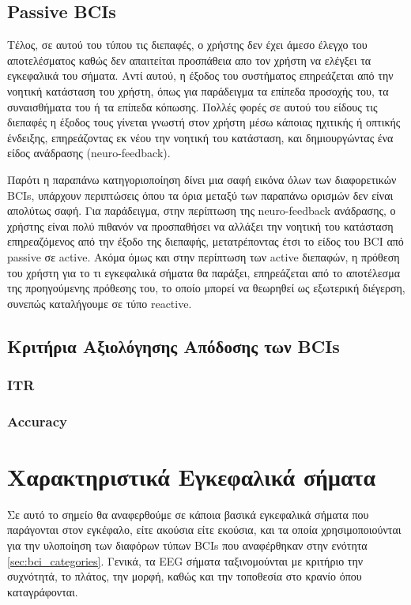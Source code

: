\documentclass[11pt,a4paper,english,greek,twoside]{../Thesis}
\begin{document}
  \subsection{Passive BCIs}
  \par Τέλος, σε αυτού του τύπου τις διεπαφές, ο χρήστης δεν έχει άμεσο έλεγχο του αποτελέσματος καθώς δεν απαιτείται προσπάθεια απο τον χρήστη να ελέγξει τα εγκεφαλικά του σήματα. Αντί αυτού, η έξοδος του συστήματος επηρεάζεται από την νοητική κατάσταση του χρήστη, όπως για παράδειγμα τα επίπεδα προσοχής του, τα συναισθήματα του ή τα επίπεδα κόπωσης. Πολλές φορές σε αυτού του είδους τις διεπαφές η έξοδος τους γίνεται γνωστή στον χρήστη μέσω κάποιας ηχιτικής ή οπτικής ένδειξης, επηρεάζοντας εκ νέου την νοητική του κατάσταση, και δημιουργώντας ένα είδος ανάδρασης (neuro-feedback). 
  
  \par Παρότι η παραπάνω κατηγοριοποίηση δίνει μια σαφή εικόνα όλων των διαφορετικών BCIs, υπάρχουν περιπτώσεις όπου τα όρια μεταξύ των παραπάνω ορισμών δεν είναι απολύτως σαφή. Για παράδειγμα, στην περίπτωση της neuro-feedback ανάδρασης, ο χρήστης είναι πολύ πιθανόν να προσπαθήσει να αλλάξει την νοητική του κατάσταση επηρεαζόμενος από την έξοδο της διεπαφής, μετατρέποντας έτσι το είδος του BCI από passive σε active. Ακόμα όμως και στην περίπτωση των active διεπαφών, η πρόθεση του χρήστη για το τι εγκεφαλικά σήματα θα παράξει, επηρεάζεται από το αποτέλεσμα της προηγούμενης πρόθεσης του, το οποίο μπορεί να θεωρηθεί ως εξωτερική διέγερση, συνεπώς καταλήγουμε σε τύπο reactive. 

  \subsection{Κριτήρια Αξιολόγησης Απόδοσης των BCIs}
  \subsubsection{ITR}
  \subsubsection{Accuracy}
  
\section{Χαρακτηριστικά Εγκεφαλικά σήματα}
  \par Σε αυτό το σημείο θα αναφερθούμε σε κάποια βασικά εγκεφαλικά σήματα που παράγονται στον εγκέφαλο, είτε ακούσια είτε εκούσια, και τα οποία χρησιμοποιούνται για την υλοποίηση των διαφόρων τύπων BCIs που αναφέρθηκαν στην ενότητα \ref{sec:bci_categories}. Γενικά, τα EEG σήματα ταξινομούνται με κριτήριο την συχνότητά, το πλάτος, την μορφή, καθώς και την τοποθεσία στο κρανίο όπου καταγράφονται.
  
\end{document}
